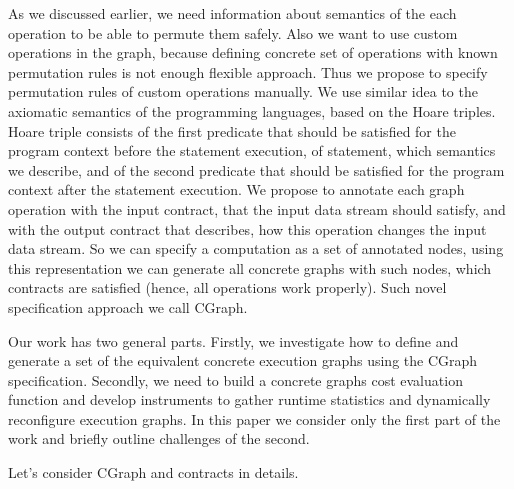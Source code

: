 As we discussed earlier, we need information about semantics of the each operation to be able to permute them safely.
Also we want to use custom operations in the graph, because defining concrete set of operations with known permutation rules is not enough flexible approach.
Thus we propose to specify permutation rules of custom operations manually.
We use similar idea to the axiomatic semantics of the programming languages, based on the Hoare triples.
Hoare triple consists of the first predicate that should be satisfied for the program context before the statement execution, of statement, which semantics we describe, and of the second predicate that should be satisfied for the program context after the statement execution.
We propose to annotate each graph operation with the input contract, that the input data stream should satisfy, and with the output contract that describes, how this operation changes the input data stream.
So we can specify a computation as a set of annotated nodes, using this representation we can generate all concrete graphs with such nodes, which contracts are satisfied (hence, all operations work properly).
Such novel specification approach we call CGraph.

Our work has two general parts.
Firstly, we investigate how to define and generate a set of the equivalent concrete execution graphs using the CGraph specification.
Secondly, we need to build a concrete graphs cost evaluation function and develop instruments to gather runtime statistics and dynamically reconfigure execution graphs.
In this paper we consider only the first part of the work and briefly outline challenges of the second.

Let's consider CGraph and contracts in details.

